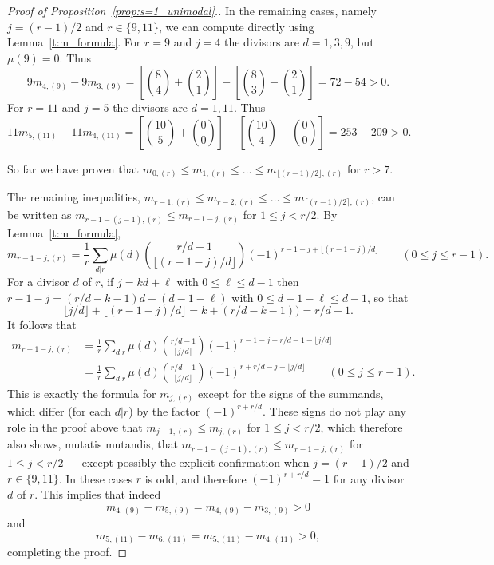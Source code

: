 \documentclass[ALCO,published]{cedram}
\begin{document}
\begin{proof}[Proof of Proposition~\ref{prop:s=1_unimodal}.]
	In the remaining cases, namely $j = (r-1)/2$ and $r \in \{9,11\}$, we can compute directly using 	Lemma~\ref{t:m_formula}.
	For $r=9$ and $j=4$ the divisors are $d=1,3,9$, but $\mu(9) = 0$. Thus
	\[
		9m_{4,(9)}-9m_{3,(9)} 
		= \left[ \binom{8}{4} + \binom{2}{1} \right]
		- \left[ \binom{8}{3} - \binom{2}{1} \right]
		= 72 - 54 > 0.
	\]
	For $r=11$ and $j=5$ the divisors are $d=1,11$. Thus
	\[
		11m_{5,(11)}-11m_{4,(11)} 
		= \left[ \binom{10}{5} + \binom{0}{0} \right]
		- \left[ \binom{10}{4} - \binom{0}{0} \right]
		= 253 - 209 > 0.
	\]
    
	So far we have proven that $m_{0,(r)} \le m_{1,(r)} \le \ldots \le m_{\lfloor (r-1)/2 \rfloor, (r)}$ for $r > 7$.
	
	The remaining inequalities, $m_{r-1,(r)} \le m_{r-2,(r)} \le \ldots \le m_{\lceil (r-1)/2 \rceil, (r)}$, can be written as $m_{r - 1 - (j-1),(r)} \le m_{r - 1 - j,(r)}$ for $1 \le j < r/2$.
	By Lemma~\ref{t:m_formula},
	\[
		m_{r-1-j,(r)}
		= \frac{1}{r} \sum_{d|r} \mu(d) \binom{r/d - 1}{\lfloor (r-1-j)/d \rfloor}  (-1)^{r-1-j+\lfloor (r-1-j)/d \rfloor} 
		\qquad (0 \le j \le r-1).
    \]
    For a divisor $d$ of $r$, if $j = kd + \ell$ with $0 \le \ell \le d-1$ 
    then $r-1-j = (r/d-k-1)d + (d-1-\ell)$ with $0 \le d-1-\ell \le d-1$, 
    so that
    \[
        \lfloor j/d \rfloor + \lfloor (r-1-j)/d \rfloor
        = k + (r/d-k-1)) = r/d-1.
    \]
    It follows that
	\begin{align*}
		m_{r-1-j,(r)}
		&= \frac{1}{r} \sum_{d|r} \mu(d) \binom{r/d - 1}{\lfloor j/d \rfloor}  (-1)^{r-1-j+r/d-1-\lfloor j/d \rfloor} \\
		&= \frac{1}{r} \sum_{d|r} \mu(d) \binom{r/d - 1}{\lfloor j/d \rfloor}  (-1)^{r+r/d-j-\lfloor j/d \rfloor} 
		\qquad (0 \le j \le r-1).
    \end{align*}
    This is exactly the formula for $m_{j,(r)}$ except for the signs of the summands, which differ (for each $d|r$) by the factor $(-1)^{r+r/d}$.
    These signs do not play any role in the proof above that $m_{j-1,(r)} \le m_{j,(r)}$ for $1 \le j < r/2$, which therefore also shows, mutatis mutandis, that $m_{r-1-(j-1),(r)} \le m_{r-1-j,(r)}$ for $1 \le j < r/2$ --- except possibly the explicit confirmation when $j = (r-1)/2$ and $r \in \{9,11\}$. 
    In these cases $r$ is odd, and therefore $(-1)^{r+r/d} = 1$ for any divisor $d$ of $r$.
    This implies that indeed 
	\[
		m_{4,(9)}-m_{5,(9)} 
		= m_{4,(9)}-m_{3,(9)}
		> 0
	\]
	and
	\[
		m_{5,(11)}-m_{6,(11)} 
		= m_{5,(11)}-m_{4,(11)} 
		> 0,
	\]
    completing the proof.
\end{proof}
\end{document}
